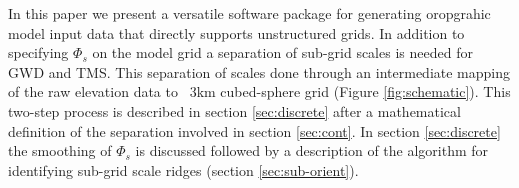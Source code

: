 \documentclass[gmd]{copernicus}
\begin{document}
%

In this paper we present a versatile software package for generating oropgrahic model input data that directly supports unstructured grids. In addition to specifying $\Phi_s$ on the model grid a separation of sub-grid scales is needed for GWD and TMS. This separation of scales done through an intermediate mapping of the raw elevation data to ~3km cubed-sphere grid (Figure \ref{fig:schematic}). This two-step process is described in section \ref{sec:discrete} after a mathematical definition of the separation involved in section \ref{sec:cont}. In section \ref{sec:discrete} the smoothing of $\Phi_s$ is discussed followed by a description of the algorithm for identifying sub-grid scale ridges (section \ref{sec:sub-orient}).
\end{document}
